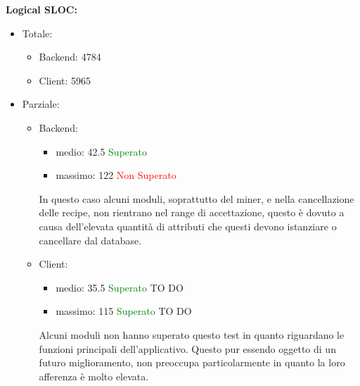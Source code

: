 \begin{description}
				\item \textbf{Logical SLOC:}\\
					\begin{itemize}	
						\item Totale:
							\begin{itemize}
								\item Backend: 4784
								\item Client: 5965
							\end{itemize}
						\item Parziale:
							\begin{itemize}		
								\item Backend:
									\begin{itemize}
										\item medio: 42.5 \textcolor{green}{Superato}
										\item massimo: 122 \textcolor{red}{Non Superato}
									\end{itemize}
					In questo caso alcuni moduli, soprattutto del miner, e nella cancellazione delle recipe, non rientrano nel range di accettazione, questo è dovuto a causa dell’elevata quantità di attributi che questi devono istanziare o cancellare dal database.			
					\item Client:
						\begin{itemize}
							\item medio: 35.5 \textcolor{green}{Superato} TO DO
							\item massimo: 115 \textcolor{green}{Superato} TO DO
						\end{itemize}
					Alcuni moduli non hanno superato questo test in quanto riguardano le funzioni principali dell'applicativo. Questo pur essendo oggetto di un futuro miglioramento, non preoccupa particolarmente in quanto la loro afferenza è molto elevata.
					\end{itemize}
					\end{itemize}
			\end{description}
	
\pagebreak